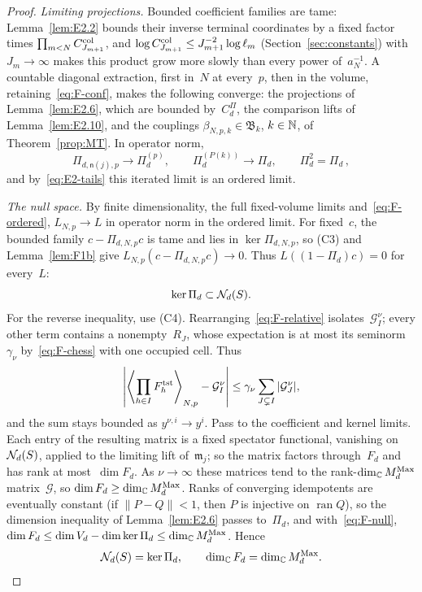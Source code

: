 \begin{proof}
\emph{Limiting projections.} Bounded coefficient families are tame: Lemma~\ref{lem:E2.2} bounds their inverse terminal coordinates by a fixed factor times $\prod_{m<N}C^{\rm col}_{J_{m+1}}$, and $\log C^{\rm col}_{J_{m+1}}\le J_{m+1}^{-2}\log\ell_m$ (Section~\ref{sec:constants}) with $J_m\to\infty$ makes this product grow more slowly than every power of~$a_N^{-1}$. A countable diagonal extraction, first in~$N$ at every~$p$, then in the volume, retaining~\eqref{eq:F-conf}, makes the following converge: the projections of Lemma~\ref{lem:E2.6}, which are bounded by~$C^\Pi_d$, the comparison lifts of Lemma~\ref{lem:E2.10}, and the couplings $\beta_{N,p,k}\in\mathfrak B_k$, $k\in\mathbb{N}$, of Theorem~\ref{prop:MT}. In operator norm,
\begin{equation}\label{eq:F-projections}
\Pi_{d,\mathsf n(j),p}\longrightarrow\Pi_d^{(p)},\qquad
\Pi_d^{(P(k))}\longrightarrow\Pi_d,\qquad
\Pi_d^2=\Pi_d\,,
\end{equation}
and by~\eqref{eq:E2-tails} this iterated limit is an ordered limit.

\emph{The null space.} By finite dimensionality, the full fixed-volume limits and~\eqref{eq:F-ordered}, $L_{N,p}\to L$ in operator norm in the ordered limit. For fixed~$c$, the bounded family $c-\Pi_{d,N,p}c$ is tame and lies in $\ker\Pi_{d,N,p}$, so (C3) and Lemma~\ref{lem:F1b} give $L_{N,p}(c-\Pi_{d,N,p}c)\to0$. Thus $L((1-\Pi_d)c)=0$ for every~$L$:
\begin{equation}\label{eq:F-null}
\ker\Pi_d\subset\mathcal{N}_{d}(S).
\end{equation}
For the reverse inequality, use (C4). Rearranging~\eqref{eq:F-relative} isolates~$\mathcal G^\nu_I$; every other term contains a nonempty~$R_J$, whose expectation is at most its seminorm~$\gamma_\nu$ by~\eqref{eq:F-chess} with one occupied cell. Thus
\begin{equation}\label{eq:F-rank}
\left|\left\langle\prod_{h\in I}F^{\rm tst}_h\right\rangle_{N,p}-\mathcal G^\nu_I\right|
\le\gamma_\nu\sum_{J\subsetneq I}|\mathcal G^\nu_J|,
\end{equation}
and the sum stays bounded as $y^{\nu,i}\to y^i$. Pass to the coefficient and kernel limits. Each entry of the resulting matrix is a fixed spectator functional, vanishing on~$\mathcal{N}_{d}(S)$, applied to the limiting lift of~$\mathfrak m_j$; so the matrix factors through~$F_d$ and has rank at most~$\dim F_d$. As $\nu\to\infty$ these matrices tend to the rank-$\dim_{\mathbb{C}}M_{d}^{\mathrm{Max}}$ matrix~$\mathcal G$, so $\dim F_d\ge\dim_{\mathbb{C}}M_{d}^{\mathrm{Max}}$. Ranks of converging idempotents are eventually constant (if $\|P-Q\|<1$, then $P$ is injective on $\operatorname{ran}Q$), so the dimension inequality of Lemma~\ref{lem:E2.6} passes to~$\Pi_d$, and with~\eqref{eq:F-null}, $\dim F_d\le\dim V_d-\dim\ker\Pi_d\le\dim_{\mathbb{C}}M_{d}^{\mathrm{Max}}$. Hence
\begin{equation}\label{eq:F-dimension}
\mathcal{N}_{d}(S)=\ker\Pi_d,\qquad \dim_{\mathbb{C}} F_d=\dim_{\mathbb{C}}M_{d}^{\mathrm{Max}}.
\end{equation}


\end{proof}
